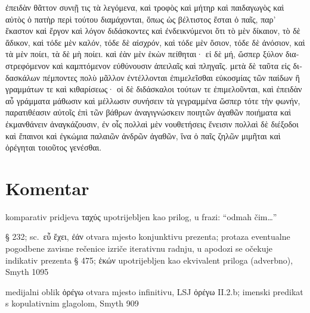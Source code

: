 {\large

\begin{greek}

\noindent ἐπειδὰν θᾶττον συνιῇ τις τὰ λεγόμενα, καὶ τροφὸς καὶ μήτηρ καὶ παιδαγωγὸς καὶ αὐτὸς ὁ πατὴρ περὶ τούτου διαμάχονται, ὅπως ὡς βέλτιστος ἔσται ὁ παῖς, παρ' ἕκαστον καὶ ἔργον καὶ λόγον διδάσκοντες καὶ ἐνδεικνύμενοι ὅτι τὸ μὲν δίκαιον, τὸ δὲ ἄδικον, καὶ τόδε μὲν καλόν, τόδε δὲ αἰσχρόν, καὶ τόδε μὲν ὅσιον, τόδε δὲ ἀνόσιον, καὶ τὰ μὲν ποίει, τὰ δὲ μὴ ποίει. καὶ ἐὰν μὲν ἑκὼν πείθηται· εἰ δὲ μή, ὥσπερ ξύλον διαστρεφόμενον καὶ καμπτόμενον εὐθύνουσιν ἀπειλαῖς καὶ πληγαῖς. μετὰ δὲ ταῦτα εἰς διδασκάλων πέμποντες πολὺ μᾶλλον ἐντέλλονται ἐπιμελεῖσθαι εὐκοσμίας τῶν παίδων ἢ γραμμάτων τε καὶ κιθαρίσεως· οἱ δὲ διδάσκαλοι τούτων τε ἐπιμελοῦνται, καὶ ἐπειδὰν αὖ γράμματα μάθωσιν καὶ μέλλωσιν συνήσειν τὰ γεγραμμένα ὥσπερ τότε τὴν φωνήν, παρατιθέασιν αὐτοῖς ἐπὶ τῶν βάθρων ἀναγιγνώσκειν ποιητῶν ἀγαθῶν ποιήματα καὶ ἐκμανθάνειν ἀναγκάζουσιν, ἐν οἷς πολλαὶ μὲν νουθετήσεις ἔνεισιν πολλαὶ δὲ διέξοδοι καὶ ἔπαινοι καὶ ἐγκώμια παλαιῶν ἀνδρῶν ἀγαθῶν, ἵνα ὁ παῖς ζηλῶν μιμῆται καὶ ὀρέγηται τοιοῦτος γενέσθαι.

\end{greek}

}


\section*{Komentar}


\begin{description}[noitemsep]
\item[ἐπειδὰν θᾶττον] komparativ pridjeva ταχύς upotrijebljen kao prilog, u frazi: ``odmah čim\dots''
\end{description}


\begin{description}[noitemsep]
\item[ἐὰν\dots\ ἑκὼν πείθηται] § 232; sc.\ εὖ ἔχει, ἐάν otvara mjesto konjunktivu prezenta; protaza eventualne pogodbene zavisne rečenice izriče iterativnu radnju, u apodozi se očekuje indikativ prezenta § 475; ἑκών upotrijebljen kao ekvivalent priloga (adverbno), Smyth 1095
\end{description}


\begin{description}[noitemsep]
\item[ὀρέγηται τοιοῦτος γενέσθαι] medijalni oblik ὀρέγω otvara mjesto infinitivu, LSJ ὀρέγω II.2.b; imenski predikat s kopulativnim glagolom, Smyth 909

\end{description}



